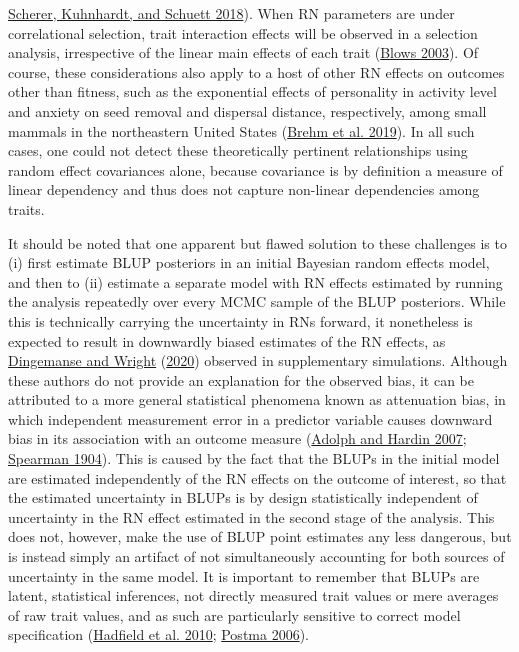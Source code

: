 \documentclass{article}
\begin{document}
\protect\hyperlink{ref-Scherer2018}{Scherer, Kuhnhardt, and Schuett
2018}). When RN parameters are under correlational selection, trait
interaction effects will be observed in a selection analysis,
irrespective of the linear main effects of each trait
(\protect\hyperlink{ref-Blows2003}{Blows 2003}). Of course, these
considerations also apply to a host of other RN effects on outcomes
other than fitness, such as the exponential effects of personality in
activity level and anxiety on seed removal and dispersal distance,
respectively, among small mammals in the northeastern United States
(\protect\hyperlink{ref-Brehm2019}{Brehm et al. 2019}). In all such
cases, one could not detect these theoretically pertinent relationships
using random effect covariances alone, because covariance is by
definition a measure of linear dependency and thus does not capture
non-linear dependencies among traits.

It should be noted that one apparent but flawed solution to these
challenges is to (i) first estimate BLUP posteriors in an initial
Bayesian random effects model, and then to (ii) estimate a separate
model with RN effects estimated by running the analysis repeatedly over
every MCMC sample of the BLUP posteriors. While this is technically
carrying the uncertainty in RNs forward, it nonetheless is expected to
result in downwardly biased estimates of the RN effects, as
\protect\hyperlink{ref-Ding2020}{Dingemanse and Wright}
(\protect\hyperlink{ref-Ding2020}{2020}) observed in supplementary
simulations. Although these authors do not provide an explanation for
the observed bias, it can be attributed to a more general statistical
phenomena known as attenuation bias, in which independent measurement
error in a predictor variable causes downward bias in its association
with an outcome measure (\protect\hyperlink{ref-Adolf2007}{Adolph and
Hardin 2007}; \protect\hyperlink{ref-Spearman1904}{Spearman 1904}). This
is caused by the fact that the BLUPs in the initial model are estimated
independently of the RN effects on the outcome of interest, so that the
estimated uncertainty in BLUPs is by design statistically independent of
uncertainty in the RN effect estimated in the second stage of the
analysis. This does not, however, make the use of BLUP point estimates
any less dangerous, but is instead simply an artifact of not
simultaneously accounting for both sources of uncertainty in the same
model. It is important to remember that BLUPs are latent, statistical
inferences, not directly measured trait values or mere averages of raw
trait values, and as such are particularly sensitive to correct model
specification (\protect\hyperlink{ref-Hadfield2010}{Hadfield et al.
2010}; \protect\hyperlink{ref-Postma2006}{Postma 2006}).
\end{document}
